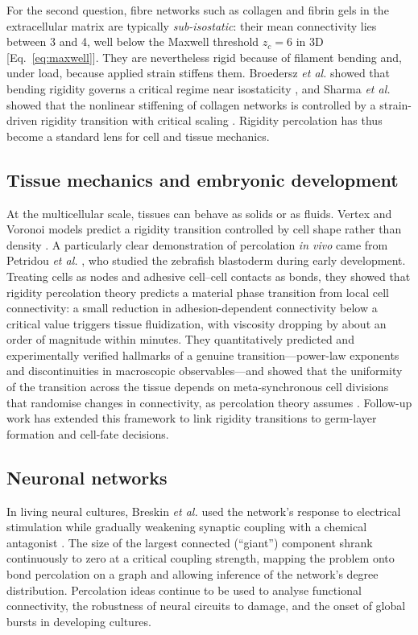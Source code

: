 \documentclass[11pt]{article}
\begin{document}
For the second question, fibre networks such as collagen and fibrin gels in the extracellular matrix are typically \emph{sub-isostatic}: their mean connectivity lies between 3 and 4, well below the Maxwell threshold $z_c=6$ in 3D [Eq.~\eqref{eq:maxwell}]. They are nevertheless rigid because of filament bending and, under load, because applied strain stiffens them. Broedersz \emph{et al.} showed that bending rigidity governs a critical regime near isostaticity \cite{Broedersz2011}, and Sharma \emph{et al.} showed that the nonlinear stiffening of collagen networks is controlled by a strain-driven rigidity transition with critical scaling \cite{Sharma2016}. Rigidity percolation has thus become a standard lens for cell and tissue mechanics.

\subsection{Tissue mechanics and embryonic development}

At the multicellular scale, tissues can behave as solids or as fluids. Vertex and Voronoi models predict a rigidity transition controlled by cell shape rather than density \cite{Bi2015}. A particularly clear demonstration of percolation \emph{in vivo} came from Petridou \emph{et al.} \cite{Petridou2021}, who studied the zebrafish blastoderm during early development. Treating cells as nodes and adhesive cell--cell contacts as bonds, they showed that rigidity percolation theory predicts a material phase transition from local cell connectivity: a small reduction in adhesion-dependent connectivity below a critical value triggers tissue fluidization, with viscosity dropping by about an order of magnitude within minutes. They quantitatively predicted and experimentally verified hallmarks of a genuine transition---power-law exponents and discontinuities in macroscopic observables---and showed that the uniformity of the transition across the tissue depends on meta-synchronous cell divisions that randomise changes in connectivity, as percolation theory assumes \cite{Petridou2021}. Follow-up work has extended this framework to link rigidity transitions to germ-layer formation and cell-fate decisions.

\subsection{Neuronal networks}

In living neural cultures, Breskin \emph{et al.} used the network's response to electrical stimulation while gradually weakening synaptic coupling with a chemical antagonist \cite{Breskin2006}. The size of the largest connected (``giant'') component shrank continuously to zero at a critical coupling strength, mapping the problem onto bond percolation on a graph and allowing inference of the network's degree distribution. Percolation ideas continue to be used to analyse functional connectivity, the robustness of neural circuits to damage, and the onset of global bursts in developing cultures.
\end{document}
